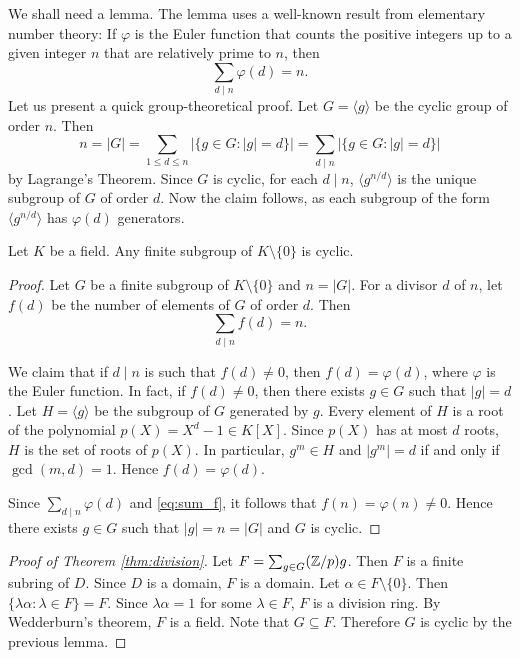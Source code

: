 We shall need a lemma. The lemma 
uses a well-known result from elementary number theory:
If $\varphi$ is the Euler function that 
counts the positive integers up to a given integer $n$ 
that are relatively prime to $n$, then 
\[
\sum_{d\mid n}\varphi(d)=n.
\]
Let us present a quick group-theoretical proof. 
Let $G=\langle g\rangle$ be the cyclic group of order $n$.
Then 
\[
n=|G|=\sum_{1\leq d\leq n}|\{g\in G:|g|=d\}|
=\sum_{d\mid n}|\{g\in G:|g|=d\}|
\]
by Lagrange's Theorem. Since $G$ is cyclic, 
for each $d\mid n$, 
$\langle g^{n/d}\rangle$ is the 
unique subgroup of $G$ of order $d$. Now the claim follows, 
as each subgroup
of the form $\langle g^{n/d}\rangle$ has $\varphi(d)$ 
generators. 

\begin{lemma}
    Let $K$ be a field. 
    Any finite subgroup of $K\setminus\{0\}$ is cyclic. 
\end{lemma}

\begin{proof}
    Let $G$ be a finite subgroup of $K\setminus\{0\}$ and
    $n=|G|$. For a divisor $d$ of $n$, let
    $f(d)$ be the number of elements of $G$ of order $d$. 
    Then 
    \begin{equation}
    \label{eq:sum_f}
    \sum_{d\mid n}f(d)=n.
    \end{equation}
    
    We claim that if $d\mid n$ is such that
    $f(d)\ne0$, then $f(d)=\varphi(d)$, where $\varphi$ is
    the Euler function. In fact, if $f(d)\ne 0$, 
    then there exists $g\in G$ such that $|g|=d$. Let 
    $H=\langle g\rangle$ be the subgroup of $G$ generated by $g$.
    Every element of $H$ is a root of the polynomial
    $p(X)=X^d-1\in K[X]$. Since $p(X)$ has at most $d$ roots, 
    $H$ is the set of roots of $p(X)$. In particular, 
    $g^m\in H$ and $|g^m|=d$ if and only if $\gcd(m,d)=1$. Hence
    $f(d)=\varphi(d)$.

    Since $\sum_{d\mid n}\varphi(d)$ and \eqref{eq:sum_f}, 
    it follows that $f(n)=\varphi(n)\ne0$.
    Hence there exists $g\in G$ such that 
    $|g|=n=|G|$ and $G$ is cyclic.
\end{proof}

\begin{proof}[Proof of Theorem \ref{thm:division}]
    Let $F=\sum_{g\in G}(\mathbb{Z}/p)g$. Then $F$ is a finite 
    subring of $D$. Since $D$ is a domain, $F$ is a domain. 
    Let $\alpha\in F\setminus\{0\}$. 
    Then 
    $\{\lambda\alpha:\lambda\in F\}=F$. Since $\lambda\alpha=1$
    for some $\lambda\in F$, $F$ is a division ring. By Wedderburn's 
    theorem, $F$ is a field. Note that $G\subseteq F$. 
    Therefore $G$ is cyclic by the previous lemma. 
\end{proof}

